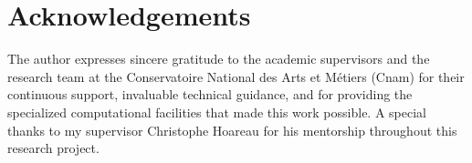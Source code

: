 \chapter*{Acknowledgements}

\noindent The author expresses sincere gratitude to the academic supervisors and the research team at the Conservatoire National des Arts et Métiers (Cnam) for their continuous support, invaluable technical guidance, and for providing the specialized computational facilities that made this work possible. A special thanks to my supervisor Christophe Hoareau for his mentorship throughout this research project.

